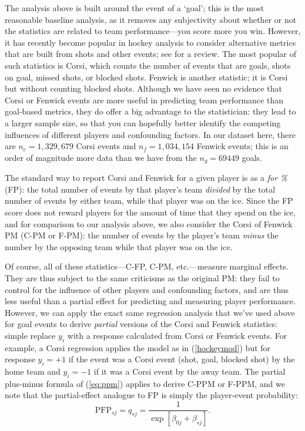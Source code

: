 The analysis above is built around the event of a `goal'; this is the most
reasonable baseline analysis, as it removes any subjectivity about whether or
not the statistics are related to team performance---you score more you win.
However, it has recently become popular in hockey analysis to consider
alternative metrics that are built from shots and other events; see
\cite{vol10} for a review. The most popular of such statistics is Corsi, which
counts the number of events that are goals, shots on goal, missed shots, or
blocked shots.  Fenwick is another statistic; it is Corsi but without counting
blocked shots.  Although we have seen no evidence that Corsi or Fenwick events
are more useful in predicting team performance than goal-based metrics, they
do offer a big advantage to the statistician: they lead to a larger sample
size, so that you can hopefully better identify the competing influences of
different players and confounding factors. In our dataset here, there are
$n_{c}=1,329,679$ Corsi events and $n_{f}=1,034,154$ Fenwick events; this is
an order of magnitude more data than we have from the $n_g=69449$ goals.

The standard way to report Corsi and Fenwick for a given player is as a
\textit{for \%} (FP): the total number of events by that player's team
\textit{divided} by the total number of events by either team, while that
player was on the ice.  Since the FP score does not reward players for the
amount of time that they spend on the ice, and for comparison to our analysis
above, we also consider the Corsi of Fenwick PM (C-PM or F-PM): the number
of events by the player's team \textit{minus} the number by the opposing team
while that player was on the ice.  

Of course, all of these statistics---C-FP, C-PM, etc.---measure marginal
effects.  They are thus subject to the same criticisms as the original PM:
they fail to control for the influence of other players and confounding
factors, and are thus less useful than a partial effect for predicting and
measuring player performance.  However, we can apply the exact same regression
analysis that we've used above for goal events to derive \textit{partial}
versions of the Corsi and Fenwick statistics: simple replace $y_i$ with a
response calculated from Corsi or Fenwick events.  For example, a Corsi
regression applies the model as in (\ref{hockeymod}) but for response $y_i=+1$
if the event was a Corsi event (shot, goal, blocked shot) by the home team and
$y_i=-1$ if it was a Corsi event by the away team. The partial plus-minus
formula of (\ref{eq:ppm}) applies to derive C-PPM or F-PPM, and we note that
the partial-effect analogue to FP is simply the player-event probability:
\begin{equation}
\text{PFP}_{sj} = q_{sj} = \frac{1}{\exp[\beta_{0j} + \beta_{sj}]}.
\end{equation}

